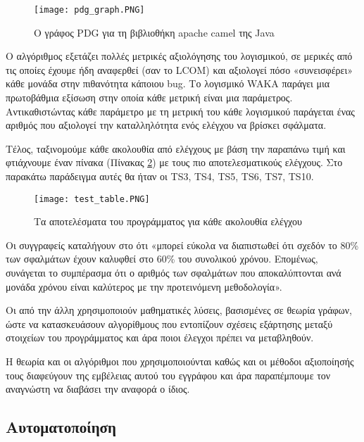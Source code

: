 \documentclass[12pt]{article}
\begin{document}
\begin{figure}
\label{fig:pdg_graph}
\caption{Ο γράφος PDG για τη βιβλιοθήκη apache camel της Java}
\texttt{[image: pdg\_graph.PNG]}
\end{figure}

\par Ο αλγόριθμος εξετάζει πολλές μετρικές αξιολόγησης του λογισμικού, σε μερικές από τις οποίες έχουμε ήδη αναφερθεί (σαν το LCOM) και αξιολογεί πόσο «συνεισφέρει» κάθε μονάδα στην πιθανότητα κάποιου bug. Το λογισμικό WAKA παράγει μια πρωτοβάθμια εξίσωση στην οποία κάθε μετρική είναι μια παράμετρος. Αντικαθιστώντας κάθε παράμετρο με τη μετρική του κάθε λογισμικού παράγεται ένας αριθμός που αξιολογεί την καταλληλότητα ενός ελέγχου να βρίσκει σφάλματα. 

\par Τέλος, ταξινομούμε κάθε ακολουθία από ελέγχους με βάση την παραπάνω τιμή και φτιάχνουμε έναν πίνακα (Πίνακας \ref{fig:test_table}) με τους πιο αποτελεσματικούς ελέγχους. Στο παρακάτω παράδειγμα αυτές θα ήταν οι TS3, TS4, TS5, TS6, TS7, TS10.

\begin{figure}
\label{fig:test_table}
\caption{Τα αποτελέσματα του προγράμματος για κάθε ακολουθία ελέγχου}
\texttt{[image: test\_table.PNG]}
\end{figure}
 
\par Οι συγγραφείς καταλήγουν στο ότι «μπορεί εύκολα να διαπιστωθεί ότι σχεδόν το 80\% των σφαλμάτων έχουν καλυφθεί στο 60\% του συνολικού χρόνου. Επομένως, συνάγεται το συμπέρασμα ότι ο αριθμός των σφαλμάτων που αποκαλύπτονται ανά μονάδα χρόνου είναι καλύτερος με την προτεινόμενη μεθοδολογία».

\par Οι \textcite{kung} από την άλλη χρησιμοποιούν μαθηματικές λύσεις, βασισμένες σε θεωρία γράφων, ώστε να κατασκευάσουν αλγορίθμους που εντοπίζουν σχέσεις εξάρτησης μεταξύ στοιχείων του προγράμματος και άρα ποιοι έλεγχοι πρέπει να μεταβληθούν.

\par Η θεωρία και οι αλγόριθμοι που χρησιμοποιούνται καθώς και οι μέθοδοι αξιοποίησής τους διαφεύγουν της εμβέλειας αυτού του εγγράφου και άρα παραπέμπουμε τον αναγνώστη να διαβάσει την αναφορά ο ίδιος. 
 
\subsection{Αυτοματοποίηση}
\end{document}
